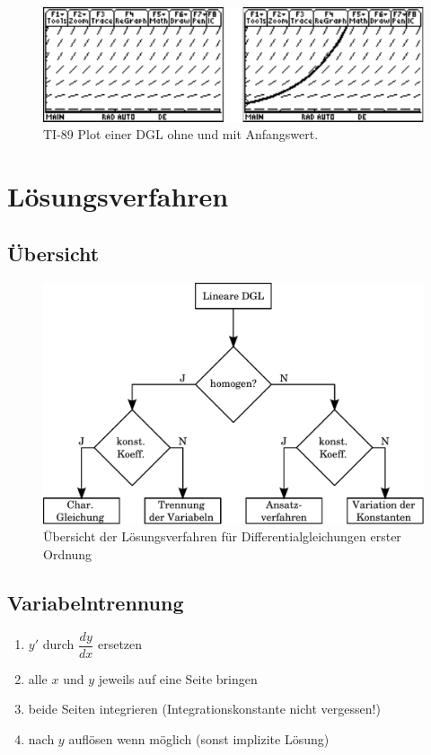 \begin{figure}[h!]
	\centering
	\includegraphics[scale=0.7]{../fig/ti89-plot-dgl.pdf}
	\caption{TI-89 Plot einer DGL ohne und mit Anfangswert.}
\end{figure}

\fi

\newpage
\section{Lösungsverfahren}

\subsection{Übersicht}
\begin{figure}[h!]
	\centering
	\includegraphics[width=1\textwidth]{../fig/diffgl_loes.pdf}
	\caption{Übersicht der Lösungsverfahren für Differentialgleichungen 
	erster Ordnung}
\end{figure}

\subsection{Variabelntrennung}
\begin{enumerate}
  \item $y'$ durch $\dfrac{dy}{dx}$ ersetzen
  \item alle $x$ und $y$ jeweils auf eine Seite bringen
  \item beide Seiten integrieren (Integrationskonstante nicht vergessen!)
  \item nach $y$ auflösen wenn möglich (sonst implizite Lösung)
\end{enumerate}

